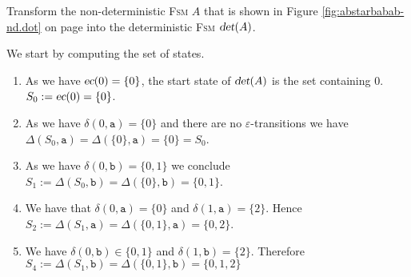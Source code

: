 \exerciseEng
Transform the non-deterministic \textsc{Fsm} $A$ that is shown in Figure \ref{fig:abstarbabab-nd.dot} on page
\pageref{fig:abstarbabab-nd.dot}  into the deterministic \textsc{Fsm} 
$\textsl{det}(A)$.  \eox

\solutionEng
We start by computing the set of states.
\begin{enumerate}
\item As we have $\textsl{ec}(0) = \{0\}$, the start state of $\textsl{det}(A)$  is the set containing $0$.
      \\[0.2cm]
      \hspace*{1.3cm}
      $S_0 := \textsl{ec}(0) = \{ 0 \}$.
\item As we have $\delta(0, \texttt{a}) = \{0\}$ and there are no $\varepsilon$-transitions we have
      \\[0.2cm]
      \hspace*{1.3cm}
      $\Delta(S_0, \texttt{a}) = \Delta(\{0\}, \texttt{a}) = \{0\} = S_0$.
\item As we have $\delta(0, \texttt{b}) = \{0, 1\}$ we conclude
      \\[0.2cm]
      \hspace*{1.3cm}
      $S_1 := \Delta(S_0, \texttt{b}) = \Delta(\{0\}, \texttt{b}) = \{ 0, 1 \}$.
\item We have that $\delta(0, \texttt{a}) = \{ 0 \}$ and $\delta(1, \texttt{a}) = \{ 2 \}$.
      Hence
      \\[0.2cm]
      \hspace*{1.3cm}
      $S_2 := \Delta(S_1, \texttt{a}) = \Delta(\{ 0, 1 \}, \texttt{a}) = \{ 0, 2 \}$.
\item We have $\delta(0, \texttt{b}) \in \{ 0, 1 \}$ and $\delta(1, \texttt{b}) = \{ 2 \}$.
      Therefore
      \\[0.2cm]
      \hspace*{1.3cm}
      $S_4 := \Delta(S_1, \texttt{b}) = \Delta(\{ 0, 1 \}, \texttt{b}) = \{ 0, 1, 2 \}$


\end{enumerate}
